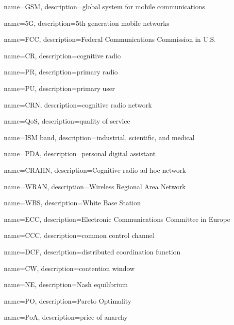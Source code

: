 {
    name=GSM,
    description={global system for mobile communications}
}
 
 
 
{
    name=5G,
    description={5th generation mobile networks}
}
 
 
 
 
 


{
    name=FCC,
    description={Federal Communications Commission in U.S.}
}
 
 
{
    name=CR,
    description={cognitive radio}
}
 
{
    name=PR,
    description={primary radio}
} 
 
{
    name=PU,
    description={primary user}
}

 
{
    name=CRN,
    description={cognitive radio network}
}
 
 
{
    name=QoS,
    description={quality of service}
}


{
    name=ISM band,
    description={industrial, scientific, and medical}
}

{
    name=PDA,
    description={personal digital assistant}
}


{
    name=CRAHN,
    description={Cognitive radio ad hoc network}
}


{
    name=WRAN,
    description={Wireless Regional Area Network}
}


{
    name=WBS,
    description={White Base Station}
}


{
    name=ECC,
    description={Electronic Communications Committee in Europe}
}


{
    name=CCC,
    description={common control channel}
}


{
    name=DCF,
    description={distributed coordination function}
}


{
    name=CW,
    description={contention window}
}


{
    name=NE,
    description={Nash equilibrium}
}

{
    name=PO,
    description={Pareto Optimality}
}


{
    name=PoA,
    description={price of anarchy}
}


